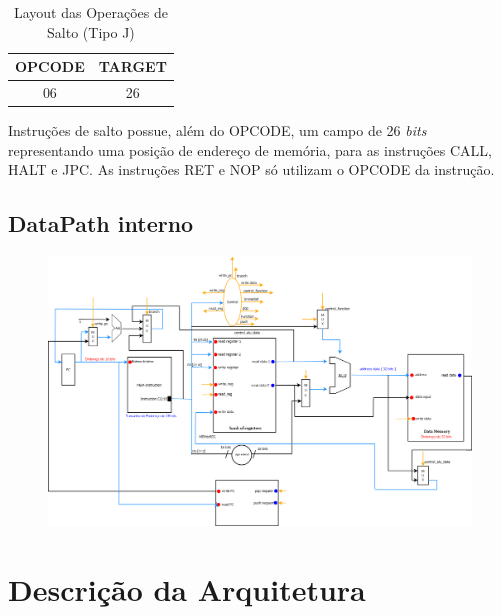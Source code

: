 \documentclass{report}
\begin{document}
\begin{itemize}
  \begin{table}[H]
\centering
	\begin{tabular}{|c|c|}
  	\hline 
  	\textbf{OPCODE} & \textbf{TARGET} \\ 
  	\hline 
  	06 & 26 \\ 
  	\hline 
  	\end{tabular} 
  	\caption{Layout das Operações de Salto (Tipo J)}
  \end{table}
  
  Instruções de salto possue, além do OPCODE, um campo de 26 \textit{bits} representando uma posição de endereço de memória, para as instruções CALL, HALT e JPC. As instruções RET e NOP só utilizam o OPCODE da instrução.\\
  
  \end{itemize}

\begin{landscape}
	\section{DataPath interno}
	\begin{figure}[H]
		\centering
		\includegraphics[width=\linewidth]{./pictures/datapath/DataPath.png}
	\end{figure}
\end{landscape}

\chapter{Descrição da Arquitetura}
\end{document}
